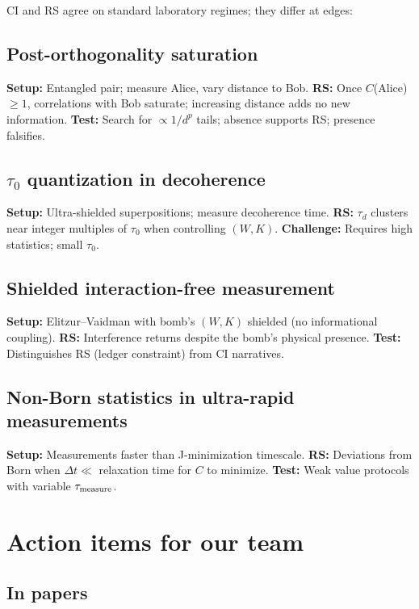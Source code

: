 \documentclass[11pt]{article}
\begin{document}
CI and RS agree on standard laboratory regimes; they differ at edges:

\subsection*{Post-orthogonality saturation}
\textbf{Setup:} Entangled pair; measure Alice, vary distance to Bob.\quad
\textbf{RS:} Once $C$(Alice) $\ge 1$, correlations with Bob saturate; increasing distance adds no new information.\quad
\textbf{Test:} Search for $\propto 1/d^p$ tails; absence supports RS; presence falsifies.

\subsection*{$\tau_0$ quantization in decoherence}
\textbf{Setup:} Ultra-shielded superpositions; measure decoherence time.\quad
\textbf{RS:} $\tau_d$ clusters near integer multiples of $\tau_0$ when controlling $(W,K)$.\quad
\textbf{Challenge:} Requires high statistics; small $\tau_0$.

\subsection*{Shielded interaction-free measurement}
\textbf{Setup:} Elitzur--Vaidman with bomb's $(W,K)$ shielded (no informational coupling).\quad
\textbf{RS:} Interference returns despite the bomb's physical presence.\quad
\textbf{Test:} Distinguishes RS (ledger constraint) from CI narratives.

\subsection*{Non-Born statistics in ultra-rapid measurements}
\textbf{Setup:} Measurements faster than J-minimization timescale.\quad
\textbf{RS:} Deviations from Born when $\Delta t \ll$ relaxation time for $C$ to minimize.\quad
\textbf{Test:} Weak value protocols with variable $\tau_{\rm measure}$.

\section{Action items for our team}

\subsection{In papers}
\end{document}
